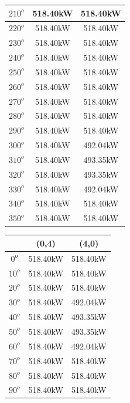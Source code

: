 \begin{table}[H]
\begin{tabular}{|c|c|c|}
                $210^o$ & 518.40kW & 518.40kW \\ \hline
                $220^o$ & 518.40kW & 518.40kW \\ \hline
                $230^o$ & 518.40kW & 518.40kW \\ \hline
                $240^o$ & 518.40kW & 518.40kW \\ \hline
                $250^o$ & 518.40kW & 518.40kW \\ \hline
                $260^o$ & 518.40kW & 518.40kW \\ \hline
                $270^o$ & 518.40kW & 518.40kW \\ \hline
                $280^o$ & 518.40kW & 518.40kW \\ \hline
                $290^o$ & 518.40kW & 518.40kW \\ \hline
                $300^o$ & 518.40kW & 492.04kW \\ \hline
                $310^o$ & 518.40kW & 493.35kW \\ \hline
                $320^o$ & 518.40kW & 493.35kW \\ \hline
                $330^o$ & 518.40kW & 492.04kW \\ \hline
                $340^o$ & 518.40kW & 518.40kW \\ \hline
                $350^o$ & 518.40kW & 518.40kW \\ \hline
            \end{tabular}
            \quad
            \begin{tabular}{|c|c|c|} \hline
                 & (0,4) & (4,0) \\ \hline
                $0^o$ & 518.40kW & 518.40kW \\ \hline
                $10^o$ & 518.40kW & 518.40kW \\ \hline
                $20^o$ & 518.40kW & 518.40kW \\ \hline
                $30^o$ & 518.40kW & 492.04kW \\ \hline
                $40^o$ & 518.40kW & 493.35kW \\ \hline
                $50^o$ & 518.40kW & 493.35kW \\ \hline
                $60^o$ & 518.40kW & 492.04kW \\ \hline
                $70^o$ & 518.40kW & 518.40kW \\ \hline
                $80^o$ & 518.40kW & 518.40kW \\ \hline
                $90^o$ & 518.40kW & 518.40kW \\ \hline

\end{tabular}
\end{table}
